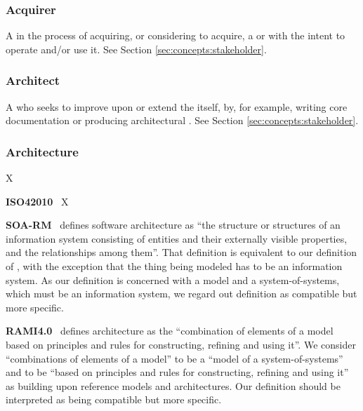 {

\newcommand{\GlossaryEntry}[3][]{\subsubsection*{#3\IfStrEq{#1}{}{}{ {\normalfont \textit{#1}}}}\label{sec:glossary:#2}}
\newcommand{\GlossaryNote}[2]{\begin{minipage}[b]{\dimexpr\linewidth-0.5cm\relax}\vspace*{0.33cm}\footnotesize{\textbf{#1}\ #2}\end{minipage}}

\GlossaryEntry{acquirer}{Acquirer}
A  in the process of acquiring, or considering to acquire, a  or  with the intent to operate and/or use it.
See Section \ref{sec:concepts:stakeholder}.

\GlossaryEntry{architect}{Architect}
A  who seeks to improve upon or extend the  itself, by, for example, writing core documentation or producing architectural .
See Section \ref{sec:concepts:stakeholder}.

\GlossaryEntry{architecture}{Architecture}
X

	\GlossaryNote{ISO42010}{
		X
	}

	\GlossaryNote{SOA-RM}{
		defines software architecture as ``the structure or structures of an information system consisting of entities and their externally visible properties, and the relationships among them''.
		That definition is equivalent to our definition of \GlossaryHyperRef{model}{model}, with the exception that the thing being modeled has to be an information system.
		As our definition is concerned with a model and a system-of-systems, which must be an information system, we regard out definition as compatible but more specific.
	}

	\GlossaryNote{RAMI4.0}{
		defines architecture as the ``combination of elements of a model based on principles and rules for constructing, refining and using it''.
		We consider ``combinations of elements of a model'' to be a ``model of a system-of-systems'' and to be ``based on principles and rules for constructing, refining and using it'' as building upon reference models and architectures.
		Our definition should be interpreted as being compatible but more specific.
	}


}
